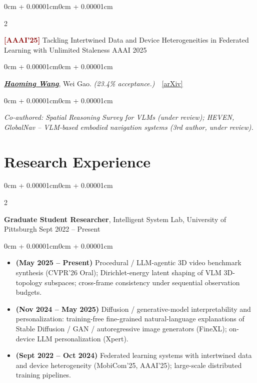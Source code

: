 \documentclass[10pt, letterpaper]{article}
\newenvironment{highlights}{
    \begin{itemize}[topsep=0.08cm,parsep=0.08cm,partopsep=0pt,itemsep=0pt,leftmargin=0cm + 10pt]
}{\end{itemize}}
\newenvironment{onecolentry}{
    \begin{adjustwidth}{0cm + 0.00001cm}{0cm + 0.00001cm}
}{\end{adjustwidth}}
\newenvironment{twocolentry}[2][]{
    \onecolentry
    \def\secondColumn{#2}
    \setcolumnwidth{\fill, 4.5cm}
    \begin{paracol}{2}
}{\switchcolumn \raggedleft \secondColumn \end{paracol} \endonecolentry}
\let\hrefWithoutArrow\href
\begin{document}
\vspace{0.14cm}

\begin{twocolentry}{AAAI 2025}
    \textcolor{darkred}{\textbf{[AAAI'25]}} Tackling Intertwined Data and Device Heterogeneities in Federated Learning with Unlimited Staleness
\end{twocolentry}
\vspace{0.04cm}
\begin{onecolentry}
\underline{\textbf{\textit{Haoming Wang}}}, Wei Gao. \textit{(23.4\% acceptance.)} \,\,
\hrefWithoutArrow{https://arxiv.org/abs/2309.13536}{[arXiv]}
\end{onecolentry}

\vspace{0.06cm}
\begin{onecolentry}
\textit{\small Co-authored: Spatial Reasoning Survey for VLMs (under review); HEVEN, GlobalNav -- VLM-based embodied navigation systems (3rd author, under review).}
\end{onecolentry}

\section{Research Experience}

\begin{twocolentry}{Sept 2022 -- Present}
    \textbf{Graduate Student Researcher}, Intelligent System Lab, University of Pittsburgh
\end{twocolentry}
\vspace{0.06cm}
\begin{onecolentry}
\begin{highlights}
    \item \textbf{(May 2025 -- Present)} Procedural / LLM-agentic 3D video benchmark synthesis (CVPR'26 Oral); Dirichlet-energy latent shaping of VLM 3D-topology subspaces; cross-frame consistency under sequential observation budgets.
    \item \textbf{(Nov 2024 -- May 2025)} Diffusion / generative-model interpretability and personalization: training-free fine-grained natural-language explanations of Stable Diffusion / GAN / autoregressive image generators (FineXL); on-device LLM personalization (Xpert).
    \item \textbf{(Sept 2022 -- Oct 2024)} Federated learning systems with intertwined data and device heterogeneity (MobiCom'25, AAAI'25); large-scale distributed training pipelines.
\end{highlights}
\end{onecolentry}
\end{document}
